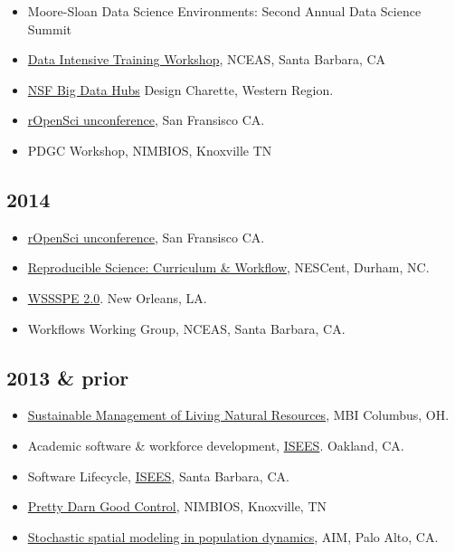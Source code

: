 \documentclass[11pt,a4paper,sans]{moderncv}        %
\providecommand{\tightlist}{%
    \setlength{\itemsep}{0pt}\setlength{\parskip}{0pt}}
\begin{document}
\begin{itemize}
\tightlist
\item
  Moore-Sloan Data Science Environments: Second Annual Data Science
  Summit
\item
  \href{https://github.com/NCEAS/ds-workshop-2015}{Data Intensive
  Training Workshop}, NCEAS, Santa Barbara, CA
\item
  \href{http://www.nsf.gov/pubs/2015/nsf15562/nsf15562.htm}{NSF Big Data
  Hubs} Design Charette, Western Region.
\item
  \href{http://unconf.ropensci.org/}{rOpenSci unconference}, San
  Fransisco CA.
\item
  PDGC Workshop, NIMBIOS, Knoxville TN
\end{itemize}

\subsection{2014}\label{section-4}

\begin{itemize}
\tightlist
\item
  \href{http://ropensci.org/blog/2014/05/14/ropenhack/}{rOpenSci
  unconference}, San Fransisco CA.
\item
  \href{https://github.com/Reproducible-Science-Curriculum/Reproducible-Science-Hackathon-Dec-08-2014}{Reproducible
  Science: Curriculum \& Workflow}, NESCent, Durham, NC.
\item
  \href{http://wssspe.researchcomputing.org.uk/wssspe2/}{WSSSPE 2.0}.
  New Orleans, LA.
\item
  Workflows Working Group, NCEAS, Santa Barbara, CA.
\end{itemize}

\subsection{2013 \& prior}\label{prior-1}

\begin{itemize}
\tightlist
\item
  \href{http://www.mbi.ohio-state.edu/2013/ws3description.html}{Sustainable
  Management of Living Natural Resources}, MBI Columbus, OH.
\item
  Academic software \& workforce development,
  \href{http://isees.nceas.ucsb.edu}{ISEES}. Oakland, CA.
\item
  Software Lifecycle, \href{http://isees.nceas.ucsb.edu}{ISEES}, Santa
  Barbara, CA.
\item
  \href{http://www.nimbios.org/workinggroups/WG_PDG}{Pretty Darn Good
  Control}, NIMBIOS, Knoxville, TN
\item
  \href{http://www.aimath.org/WWN/populationmodel/}{Stochastic spatial
  modeling in population dynamics}, AIM, Palo Alto, CA.
\end{itemize}
\end{document}

